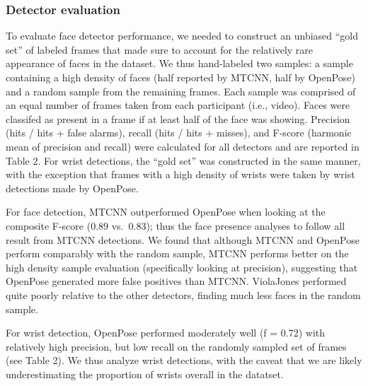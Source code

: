 \documentclass[10pt, letterpaper]{article}
\begin{document}
\subsubsection{Detector evaluation}\label{detector-evaluation}

To evaluate face detector performance, we needed to construct an
unbiased ``gold set'' of labeled frames that made sure to account for
the relatively rare appearance of faces in the dataset. We thus
hand-labeled two samples: a sample containing a high density of faces
(half reported by MTCNN, half by OpenPose) and a random sample from the
remaining frames. Each sample was comprised of an equal number of frames
taken from each participant (i.e., video). Faces were classifed as
present in a frame if at least half of the face was showing. Precision
(hits / hits + false alarms), recall (hits / hits + misses), and F-score
(harmonic mean of precision and recall) were calculated for all
detectors and are reported in Table 2. For wrist detections, the ``gold
set'' was constructed in the same manner, with the exception that frames
with a high density of wrists were taken by wrist detections made by
OpenPose.

For face detection, MTCNN outperformed OpenPose when looking at the
composite F-score (0.89 vs.~0.83); thus the face presence analyses to
follow all result from MTCNN detections. We found that although MTCNN
and OpenPose perform comparably with the random sample, MTCNN performs
better on the high density sample evaluation (specifically looking at
precision), suggesting that OpenPose generated more false positives than
MTCNN. ViolaJones performed quite poorly relative to the other
detectors, finding much less faces in the random sample.

For wrist detection, OpenPose performed moderately well (f = 0.72) with
relatively high precision, but low recall on the randomly sampled set of
frames (see Table 2). We thus analyze wrist detections, with the caveat
that we are likely underestimating the proportion of wrists overall in
the datatset.
\end{document}
